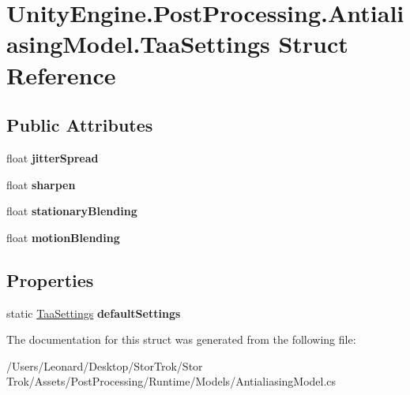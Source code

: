 \hypertarget{struct_unity_engine_1_1_post_processing_1_1_antialiasing_model_1_1_taa_settings}{}\section{Unity\+Engine.\+Post\+Processing.\+Antialiasing\+Model.\+Taa\+Settings Struct Reference}
\label{struct_unity_engine_1_1_post_processing_1_1_antialiasing_model_1_1_taa_settings}
\subsection*{Public Attributes}
\begin{DoxyCompactItemize}
\item 
\mbox{\label{struct_unity_engine_1_1_post_processing_1_1_antialiasing_model_1_1_taa_settings_a1fb4a56a3c4e2de6c9e9ab5b78c82b01}} 
float {\bfseries jitter\+Spread}
\item 
\mbox{\label{struct_unity_engine_1_1_post_processing_1_1_antialiasing_model_1_1_taa_settings_aac78045457513ebdfdf6b97490e6b181}} 
float {\bfseries sharpen}
\item 
\mbox{\label{struct_unity_engine_1_1_post_processing_1_1_antialiasing_model_1_1_taa_settings_a9c7bfc8641dc5b8229cb526b9a1e1aab}} 
float {\bfseries stationary\+Blending}
\item 
\mbox{\label{struct_unity_engine_1_1_post_processing_1_1_antialiasing_model_1_1_taa_settings_af1be8bba7027153437fcab9d9f143cf9}} 
float {\bfseries motion\+Blending}
\end{DoxyCompactItemize}
\subsection*{Properties}
\begin{DoxyCompactItemize}
\item 
\mbox{\label{struct_unity_engine_1_1_post_processing_1_1_antialiasing_model_1_1_taa_settings_a4399b2ac5c558bec9edc9af8d49b8928}} 
static \hyperlink{struct_unity_engine_1_1_post_processing_1_1_antialiasing_model_1_1_taa_settings}{Taa\+Settings} {\bfseries default\+Settings}
\end{DoxyCompactItemize}


The documentation for this struct was generated from the following file\+:\begin{DoxyCompactItemize}
\item 
/\+Users/\+Leonard/\+Desktop/\+Stor\+Trok/\+Stor Trok/\+Assets/\+Post\+Processing/\+Runtime/\+Models/Antialiasing\+Model.\+cs\end{DoxyCompactItemize}

